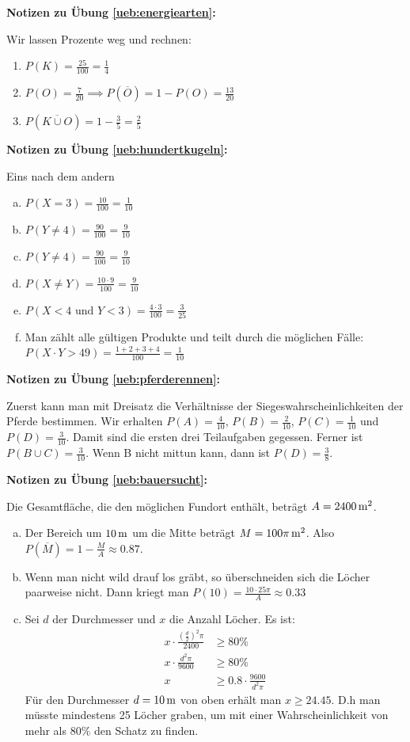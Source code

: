 \documentclass[%
11pt,%
twoside,%
titlepage,%
german,%
headsepline%
]{scrartcl}
\newcommand{\concatueb}[1]{ueb:#1}%
\newcommand{\concatlsg}[1]{lsg:#1}%
\newenvironment{lsg}[1]{%
    \par\noindent\textbf{Notizen zu Übung \ref{\concatueb{#1}}:}%
    \label{\concatlsg{#1}}\par
}{%
    \par%
}
\begin{document}
\begin{lsg}{energiearten}
Wir lassen Prozente weg und rechnen:
\begin{enumerate}
\item $P(K)=\frac{25}{100}=\frac{1}{4}$
\item $P(O)=\frac{7}{20}\implies P(\overline{O})=1-P(O)=\frac{13}{20}$
\item $P(\overline{K\cup O})=1-\frac{3}{5}=\frac{2}{5}$
\end{enumerate}
\end{lsg}

\begin{lsg}{hundertkugeln}
Eins nach dem andern
\begin{enumerate}[a)]
\item $P(X=3)=\frac{10}{100}=\frac{1}{10}$
\item $P(Y\neq4)=\frac{90}{100}=\frac{9}{10}$
\item $P(Y\neq4)=\frac{90}{100}=\frac{9}{10}$
\item $P(X \neq Y)=\frac{10\cdot9}{100}=\frac{9}{10}$
\item $P(X < 4\text{ und } Y < 3)=\frac{4\cdot 3}{100}=\frac{3}{25}$
\item Man z\"ahlt alle g\"ultigen Produkte und teilt durch die m\"oglichen F\"alle: $P(X\cdot Y > 49)=\frac{1+2+3+4}{100}=\frac{1}{10}$
\end{enumerate}
\end{lsg}

\begin{lsg}{pferderennen}
Zuerst kann man mit Dreisatz die Verh\"altnisse der Siegeswahrscheinlichkeiten der Pferde bestimmen. Wir erhalten $P(A)=\frac{4}{10}$, $P(B)=\frac{2}{10}$, $P(C)=\frac{1}{10}$ und $P(D)=\frac{3}{10}$. Damit sind die ersten drei Teilaufgaben gegessen. Ferner ist $P(B\cup C)=\frac{3}{10}$. Wenn B nicht mittun kann, dann ist $P(D)=\frac{3}{8}$.
\end{lsg}

\begin{lsg}{bauersucht}
Die Gesamtfl\"ache, die den m\"oglichen Fundort enth\"alt, betr\"agt $A=\unit[2400]{m^{2}}$.
\begin{enumerate}[a)]
\item Der Bereich um $\unit[10]{m}$ um die Mitte betr\"agt $M=\unit[100\pi]{m^{2}}$. Also $P(\overline{M})=1-\frac{M}{A}\approx0.87$.
\item Wenn man nicht wild drauf los gr\"abt, so \"uberschneiden sich die L\"ocher paarweise nicht. Dann kriegt man $P(10)=\frac{10\cdot25\pi}{A}\approx0.33$
\item Sei $d$ der Durchmesser und $x$ die Anzahl L\"ocher. Es ist:
\begin{align*}
x\cdot\frac{(\frac{d}{2})^{2}\pi}{2400} &\geq80\%\\
x\cdot\frac{d^{2}\pi}{9600} &\geq80\%\\
x &\geq 0.8\cdot\frac{9600}{d^{2}\pi}
\end{align*}
F\"ur den Durchmesser $d=\unit[10]{m}$ von oben erh\"alt man $x\geq24.45$. D.h man m\"usste mindestens 25 L\"ocher graben, um mit einer Wahrscheinlichkeit von mehr als $80\%$ den Schatz zu finden.
\end{enumerate}
\end{lsg}
\end{document}
